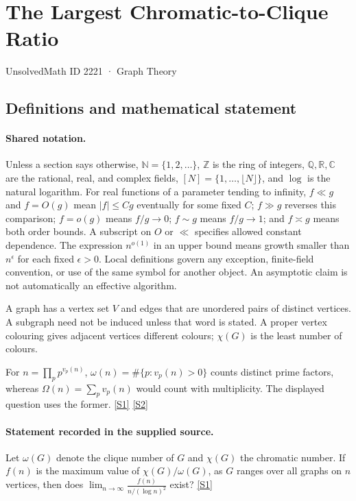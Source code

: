 \documentclass[11pt,a4paper]{article}
\newcommand{\N}{\mathbb{N}}
\newcommand{\Z}{\mathbb{Z}}
\newcommand{\Q}{\mathbb{Q}}
\newcommand{\R}{\mathbb{R}}
\newcommand{\C}{\mathbb{C}}
\newcommand{\sref}[2]{\hyperlink{source:#1:#2}{[S#2]}}
\begin{document}

\setcounter{section}{2220}

\section{The Largest Chromatic-to-Clique Ratio}\label{2221}

{\small\sffamily UnsolvedMath ID 2221 · Graph Theory}

\subsection{Definitions and mathematical statement}

\paragraph{Shared notation.}Unless a section says otherwise, $\N=\{1,2,\ldots\}$,
$\Z$ is the ring of integers, $\Q,\R,\C$ are the rational, real, and complex
fields, $[N]=\{1,\ldots,\lfloor N\rfloor\}$, and $\log$ is the natural
logarithm. For real functions of a parameter tending to infinity,
$f\ll g$ and $f=O(g)$ mean $|f|\leq Cg$ eventually for some fixed $C$;
$f\gg g$ reverses this comparison; $f=o(g)$ means $f/g\to0$;
$f\sim g$ means $f/g\to1$; and $f\asymp g$ means both order bounds.
A subscript on $O$ or $\ll$ specifies allowed constant dependence.
The expression $n^{o(1)}$ in an upper bound means growth smaller than
$n^\epsilon$ for each fixed $\epsilon>0$. Local definitions govern any
exception, finite-field convention, or use of the same symbol for another
object. An asymptotic claim is not automatically an effective algorithm.



A graph has a vertex set $V$ and edges that are unordered pairs of distinct vertices. A subgraph need not be induced unless that word is stated. A proper vertex colouring gives adjacent vertices different colours; $\chi(G)$ is the least number of colours.

For $n=\prod_pp^{v_p(n)}$, $\omega(n)=\#\{p:v_p(n)>0\}$ counts distinct prime factors, whereas $\Omega(n)=\sum_pv_p(n)$ would count with multiplicity. The displayed question uses the former. \sref{2221}{1} \sref{2221}{2}

\paragraph{Statement recorded in the supplied source.}
Let $\omega(G)$ denote the clique number of $G$ and $\chi(G)$ the chromatic number. If $f(n)$ is the maximum value of $\chi(G)/\omega(G)$, as $G$ ranges over all graphs on $n$ vertices, then does $ \lim_{n\to\infty}\frac{f(n)}{n/(\log n)^2} $ exist? \sref{2221}{1}
\end{document}
